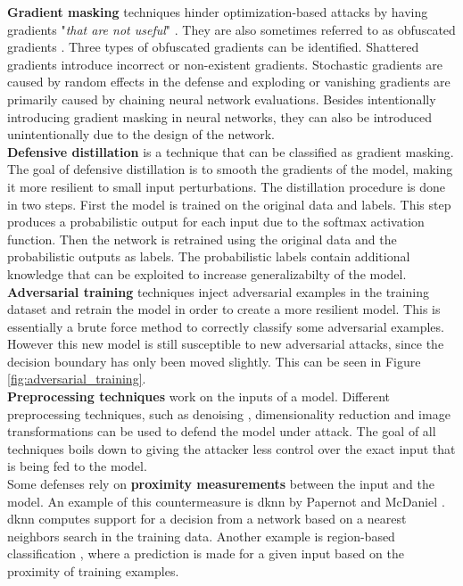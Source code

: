 \textbf{Gradient masking} techniques hinder optimization-based attacks by having gradients "\textit{that are not useful}" \cite{not_useful_gradients}. They are also sometimes referred to as obfuscated gradients \cite{obfuscated_gradients}. Three types of obfuscated gradients can be identified. Shattered gradients introduce incorrect or non-existent gradients. Stochastic gradients are caused by random effects in the defense and exploding or vanishing gradients are primarily caused by chaining neural network evaluations. Besides intentionally introducing gradient masking in neural networks, they can also be introduced unintentionally due to the design of the network.\\

\textbf{Defensive distillation}  \cite{defensive_distillation} is a technique that can be classified as gradient masking. The goal of defensive distillation is to smooth the gradients of the model, making it more resilient to small input perturbations. The distillation procedure is done in two steps. First the model is trained on the original data and labels. This step produces a probabilistic output for each input due to the softmax activation function. Then the network is retrained using the original data and the probabilistic outputs as labels. The probabilistic labels contain additional knowledge that can be exploited to increase generalizabilty of the model.\\

\textbf{Adversarial training} \cite{FGSM} techniques inject adversarial examples in the training dataset and retrain the model in order to create a more resilient model. This is essentially a brute force method to correctly classify some adversarial examples. However this new model is still susceptible to new adversarial attacks, since the decision boundary has only been moved slightly. This can be seen in Figure \ref{fig:adversarial_training}.\\

\textbf{Preprocessing techniques} work on the inputs of a model. Different preprocessing techniques, such as denoising \cite{denoising}, dimensionality reduction \cite{dimensionality_reduction} and image transformations \cite{image_transformations} can be used to defend the model under attack. The goal of all techniques boils down to giving the attacker less control over the exact input that is being fed to the model.\\

Some defenses rely on \textbf{proximity measurements} between the input and the model. An example of this countermeasure is \gls{dknn} by Papernot and McDaniel \cite{dknn}. \gls{dknn} computes support for a decision from a network based on a nearest neighbors search in the training data. Another example is region-based classification \cite{region-based_classification}, where a prediction is made for a given input based on the proximity of training examples.\\ 

